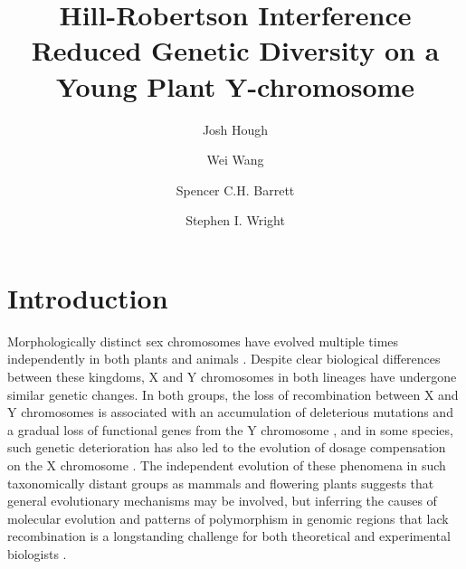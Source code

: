 \documentclass[9pt,twocolumn,twoside,lineno]{gsajnl}
\title{Hill-Robertson Interference Reduced Genetic Diversity on a Young Plant Y-chromosome}
\author[$\ast$,$\dagger$,1]{Josh Hough}
\author[$\dagger$]{Wei Wang}
\author[$\dagger$]{Spencer C.H. Barrett}
\author[$\dagger$]{Stephen I. Wright}
\affil[$\ast$]{Department of Plant Sciences, University of California, Davis}
\affil[$\dagger$]{Department of Ecology and Evolutionary Biology, University of Toronto}
\begin{document}
\maketitle
\thispagestyle{firststyle}
\marginmark
\firstpagefootnote
{}
\vspace{-11pt}

\section*{Introduction}

\lettrine[lines=2]{\color{color2}M}{}orphologically distinct sex chromosomes have evolved multiple times independently in both plants and animals \citep{westergaard1958,ohno1967,bull1983,charlesworth1991,charlesworth2015plant}. Despite clear biological differences between these kingdoms, X and Y chromosomes in both lineages have undergone similar genetic changes. In both groups, the loss of recombination between X and Y chromosomes is associated with an accumulation of deleterious mutations and a gradual loss of functional genes from the Y chromosome \citep{hough2014,bergero2015,bachtrog2013NRG}, and in some species, such genetic deterioration has also led to the evolution of dosage compensation on the X chromosome \citep{charlesworth1996CB,muyle2012,mank2013sex,papadopulos2015}. The independent evolution of these phenomena in such taxonomically distant groups as mammals and flowering plants suggests that general evolutionary mechanisms may be involved, but inferring the causes of molecular evolution and patterns of polymorphism in genomic regions that lack recombination is a longstanding challenge for both theoretical and experimental biologists \citep{charlesworth1978,feldman1980evolution,barton1995general,charlesworth1996CB,otto1997deleterious,charlesworth2000degeneration,mcvean2000effects}.
\end{document}
